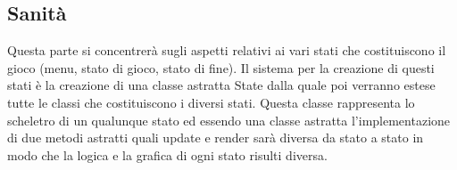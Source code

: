\documentclass[a4paper,12pt]{report}
\begin{document}
    \subsection{Sanità}
    \par Questa parte si concentrerà sugli aspetti relativi ai vari stati che costituiscono il gioco (menu, stato di gioco, stato di fine).
     Il sistema per la creazione di questi stati è la creazione di una classe astratta State dalla quale poi verranno
     estese tutte le classi che costituiscono i diversi stati. Questa classe rappresenta lo scheletro di un qualunque
     stato ed essendo una classe astratta l’implementazione di due metodi astratti quali update e render sarà diversa da
     stato a stato in modo che la logica e la grafica di ogni stato risulti diversa.
    \\
    \\
    \par
\end{document}
